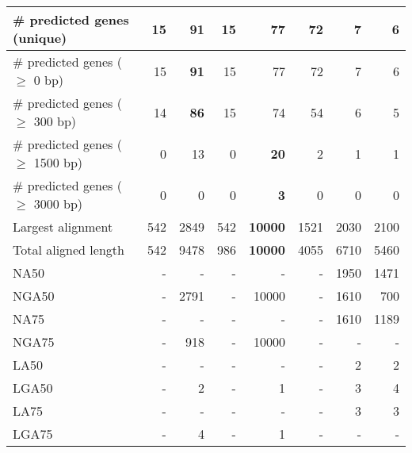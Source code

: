 \documentclass[12pt,a4paper]{article}
\begin{document}
\begin{table}[ht]
\begin{center}
\begin{tabular}{|l*{7}{|r}|}
\# predicted genes (unique) & 15 & {\bf 91} & 15 & 77 & 72 & 7 & 6 \\ \hline
\# predicted genes ($\geq$ 0 bp) & 15 & {\bf 91} & 15 & 77 & 72 & 7 & 6 \\ \hline
\# predicted genes ($\geq$ 300 bp) & 14 & {\bf 86} & 15 & 74 & 54 & 6 & 5 \\ \hline
\# predicted genes ($\geq$ 1500 bp) & 0 & 13 & 0 & {\bf 20} & 2 & 1 & 1 \\ \hline
\# predicted genes ($\geq$ 3000 bp) & 0 & 0 & 0 & {\bf 3} & 0 & 0 & 0 \\ \hline
Largest alignment & 542 & 2849 & 542 & {\bf 10000} & 1521 & 2030 & 2100 \\ \hline
Total aligned length & 542 & 9478 & 986 & {\bf 10000} & 4055 & 6710 & 5460 \\ \hline
NA50 & - & - & - & - & - & 1950 & 1471 \\ \hline
NGA50 & - & 2791 & - & 10000 & - & 1610 & 700 \\ \hline
NA75 & - & - & - & - & - & 1610 & 1189 \\ \hline
NGA75 & - & 918 & - & 10000 & - & - & - \\ \hline
LA50 & - & - & - & - & - & 2 & 2 \\ \hline
LGA50 & - & 2 & - & 1 & - & 3 & 4 \\ \hline
LA75 & - & - & - & - & - & 3 & 3 \\ \hline
LGA75 & - & 4 & - & 1 & - & - & - \\ \hline
\end{tabular}
\end{center}
\end{table}
\end{document}

